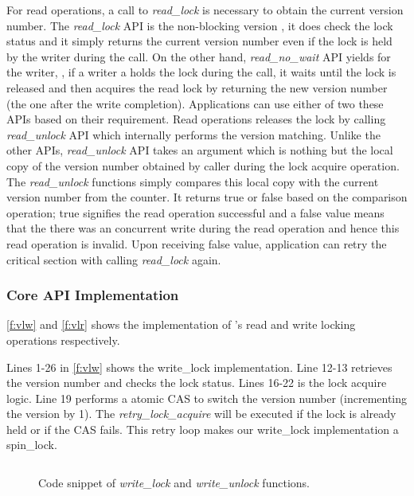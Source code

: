 For read operations, a call to \emph{read\_lock} is necessary to obtain the
current version number. The \emph{read\_lock} API is the non-blocking version
\ie, it does check the lock status and it simply returns the current version
number even if the lock is held by the writer during the call. On the other
hand, \emph{read\_no\_wait} API yields for the writer, \ie, if a writer a holds
the lock during the call, it waits until the lock is released and then acquires
the read lock by returning the new version number (the one after the write
completion). Applications can use either of two these APIs based on their
requirement. Read operations releases the lock by calling \emph{read\_unlock}
API which internally performs the version matching. Unlike the other APIs,
\emph{read\_unlock} API takes an argument which is nothing but the local copy of
the version number obtained by caller during the lock acquire operation. The
\emph{read\_unlock} functions simply compares this local copy with the current
version number from the counter. It returns true or false based on the
comparison operation; true signifies the read operation successful and a false
value means that the there was an concurrent write during the read operation and
hence this read operation is invalid. Upon receiving false value, application
can retry the critical section with calling \emph{read\_lock} again. 


\subsubsection{\sys Core API Implementation}
\label{s:des:vl:impl}

\autoref{f:vlw} and \autoref{f:vlr} shows the implementation of \sys's read and
write locking operations respectively. 

Lines 1-26 in \autoref{f:vlw} shows the write\_lock implementation. Line 12-13
retrieves the version number and checks the lock status. Lines 16-22 is the lock
acquire logic. Line 19 performs a atomic CAS to switch the version number
(incrementing the version by 1). The \emph{retry\_lock\_acquire} will be
executed if the lock is already held or if the CAS fails. This retry loop makes
our write\_lock implementation a spin\_lock. 


\begin{figure}[t]
 \centering
 \begin{subfloat}
 \centering
 \inputminted[xleftmargin=11pt,fontsize=\scriptsize,escapeinside=@@]{c}{code/vlw.c}
 \end{subfloat}
 \coderule
	\caption{Code snippet of \sys \emph{write\_lock} and \emph{write\_unlock} 
	functions. }
 \label{f:vlw}
\end{figure}

